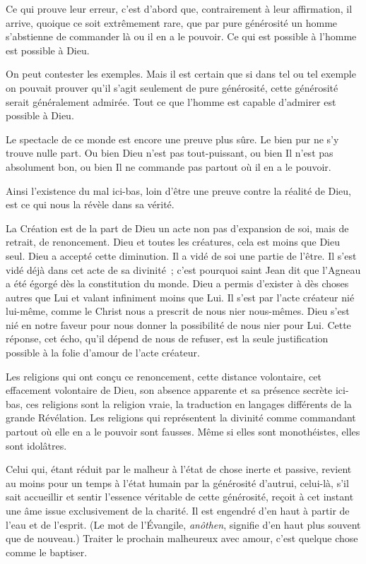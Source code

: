 \documentclass[french,twoside]{book} %
\begin{document}
Ce qui prouve leur erreur, c'est d'abord que, contrairement à leur affirmation, il arrive, quoique ce soit extrêmement rare, que par pure générosité un homme s'abstienne de commander là ou il en a le pouvoir. Ce qui est possible à l'homme est possible à Dieu.\par
On peut contester les exemples. Mais il est certain que si dans tel ou tel exemple on pouvait prouver qu'il s'agit seulement de pure générosité, cette générosité serait généralement admirée. Tout ce que l'homme est capable d'admirer est possible à Dieu.\par
Le spectacle de ce monde est encore une preuve plus sûre. Le bien pur ne s'y trouve nulle part. Ou bien Dieu n'est pas tout-puissant, ou bien Il n'est pas absolument bon, ou bien Il ne commande pas partout où il en a le pouvoir.\par
Ainsi l'existence du mal ici-bas, loin d'être une preuve contre la réalité de Dieu, est ce qui nous la révèle dans sa vérité.\par
La Création est de la part de Dieu un acte non pas d'expansion de soi, mais de retrait, de renoncement. Dieu et toutes les créatures, cela est moins que Dieu seul. Dieu a accepté cette diminution. Il a vidé de soi une partie de l'être. Il s'est vidé déjà dans cet acte de sa divinité ; c'est pourquoi saint Jean dit que l'Agneau a été égorgé dès la constitution du monde. Dieu a permis d'exister à dès choses autres que Lui et valant infiniment moins que Lui. Il s'est par l'acte créateur nié lui-même, comme le Christ nous a prescrit de nous nier nous-mêmes. Dieu s'est nié en notre faveur pour nous donner la possibilité de nous nier pour Lui. Cette réponse, cet écho, qu'il dépend de nous de refuser, est la seule justification possible à la folie d'amour de l'acte créateur.\par
Les religions qui ont conçu ce renoncement, cette distance volontaire, cet effacement volontaire de Dieu, son absence apparente et sa présence secrète ici-bas, ces religions sont la religion vraie, la traduction en langages différents de la grande Révélation. Les religions qui représentent la divinité comme commandant partout où elle en a le pouvoir sont fausses. Même si elles sont monothéistes, elles sont idolâtres.\par
Celui qui, étant réduit par le malheur à l'état de chose inerte et passive, revient au moins pour un temps à l'état humain par la générosité d'autrui, celui-là, s'il sait accueillir et sentir l'essence véritable de cette générosité, reçoit à cet instant une âme issue exclusivement de la charité. Il est engendré d'en haut à partir de l'eau et de l'esprit. (Le mot de l'Évangile, {\itshape anôthen}, signifie d'en haut plus souvent que de nouveau.) Traiter le prochain malheureux avec amour, c'est quelque chose comme le baptiser.\par
\end{document}
